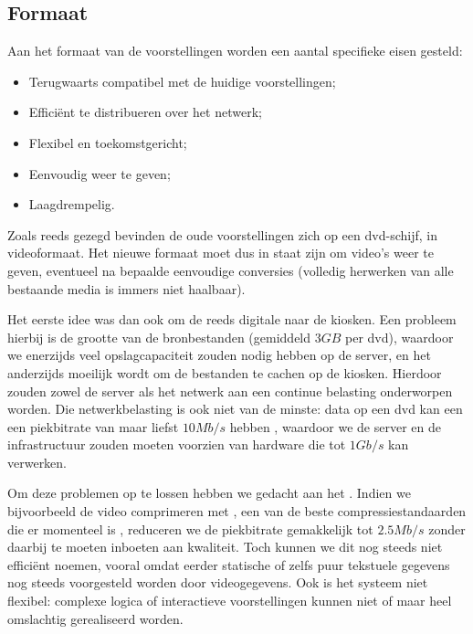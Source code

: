 \subsection{Formaat}

Aan het formaat van de voorstellingen worden een aantal specifieke eisen gesteld:
\begin{itemize}
\item Terugwaarts compatibel met de huidige voorstellingen;
\item Efficiënt te distribueren over het netwerk;
\item Flexibel en toekomstgericht;
\item Eenvoudig weer te geven;
\item Laagdrempelig.
\end{itemize}

Zoals reeds gezegd bevinden de oude voorstellingen zich op een \acs{dvd}-schijf, in videoformaat. Het nieuwe formaat moet dus in staat zijn om video's weer te geven, eventueel na bepaalde eenvoudige conversies (volledig herwerken van alle bestaande media is immers niet haalbaar).

Het eerste idee was dan ook om de reeds digitale  naar de kiosken. Een probleem hierbij is de grootte van de bronbestanden (gemiddeld $3 GB$ per \ac{dvd}), waardoor we enerzijds veel opslagcapaciteit zouden nodig hebben op de server, en het anderzijds moeilijk wordt om de bestanden te cachen op de kiosken. Hierdoor zouden zowel de server als het netwerk aan een continue belasting onderworpen worden. Die netwerkbelasting is ook niet van de minste: data op een \ac{dvd} kan een een piekbitrate van maar liefst $10 Mb/s$ hebben \citep[paragraaf 3.4]{dvddemistified}, waardoor we de server en de infrastructuur zouden moeten voorzien van hardware die tot $1 Gb/s$ kan verwerken.

Om deze problemen op te lossen hebben we gedacht aan het . Indien we bijvoorbeeld de video comprimeren met , een van de beste compressiestandaarden die er momenteel is \citep{codecs}, reduceren we de piekbitrate gemakkelijk tot $2.5 Mb/s$ zonder daarbij te moeten inboeten aan kwaliteit. Toch kunnen we dit nog steeds niet efficiënt noemen, vooral omdat eerder statische of zelfs puur tekstuele gegevens nog steeds voorgesteld worden door videogegevens. Ook is het systeem niet flexibel: complexe logica of interactieve voorstellingen kunnen niet of maar heel omslachtig gerealiseerd worden.

